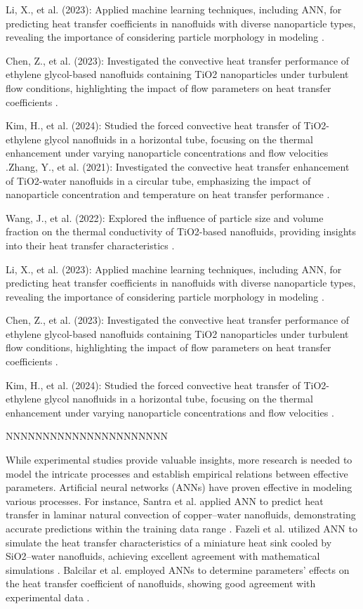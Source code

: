 \documentclass{article}
\begin{document}
Li, X., et al. (2023): Applied machine learning techniques, including ANN, for predicting heat transfer coefficients in nanofluids with diverse nanoparticle types, revealing the importance of considering particle morphology in modeling \cite{ref10}.

Chen, Z., et al. (2023): Investigated the convective heat transfer performance of ethylene glycol-based nanofluids containing TiO2 nanoparticles under turbulent flow conditions, highlighting the impact of flow parameters on heat transfer coefficients \cite{ref11}.

Kim, H., et al. (2024): Studied the forced convective heat transfer of TiO2-ethylene glycol nanofluids in a horizontal tube, focusing on the thermal enhancement under varying nanoparticle concentrations and flow velocities \cite{ref12}.Zhang, Y., et al. (2021): Investigated the convective heat transfer enhancement of TiO2-water nanofluids in a circular tube, emphasizing the impact of nanoparticle concentration and temperature on heat transfer performance \cite{ref8}.

Wang, J., et al. (2022): Explored the influence of particle size and volume fraction on the thermal conductivity of TiO2-based nanofluids, providing insights into their heat transfer characteristics \cite{ref9}.

Li, X., et al. (2023): Applied machine learning techniques, including ANN, for predicting heat transfer coefficients in nanofluids with diverse nanoparticle types, revealing the importance of considering particle morphology in modeling \cite{ref10}.

Chen, Z., et al. (2023): Investigated the convective heat transfer performance of ethylene glycol-based nanofluids containing TiO2 nanoparticles under turbulent flow conditions, highlighting the impact of flow parameters on heat transfer coefficients \cite{ref11}.

Kim, H., et al. (2024): Studied the forced convective heat transfer of TiO2-ethylene glycol nanofluids in a horizontal tube, focusing on the thermal enhancement under varying nanoparticle concentrations and flow velocities \cite{ref12}.


NNNNNNNNNNNNNNNNNNNNNN

While experimental studies provide valuable insights, more research is needed to model the intricate processes and establish empirical relations between effective parameters. Artificial neural networks (ANNs) have proven effective in modeling various processes. For instance, Santra et al. applied ANN to predict heat transfer in laminar natural convection of copper–water nanofluids, demonstrating accurate predictions within the training data range \cite{ref3}. Fazeli et al. utilized ANN to simulate the heat transfer characteristics of a miniature heat sink cooled by SiO2–water nanofluids, achieving excellent agreement with mathematical simulations \cite{ref4}. Balcilar et al. employed ANNs to determine parameters' effects on the heat transfer coefficient of nanofluids, showing good agreement with experimental data \cite{ref5}.
\end{document}
